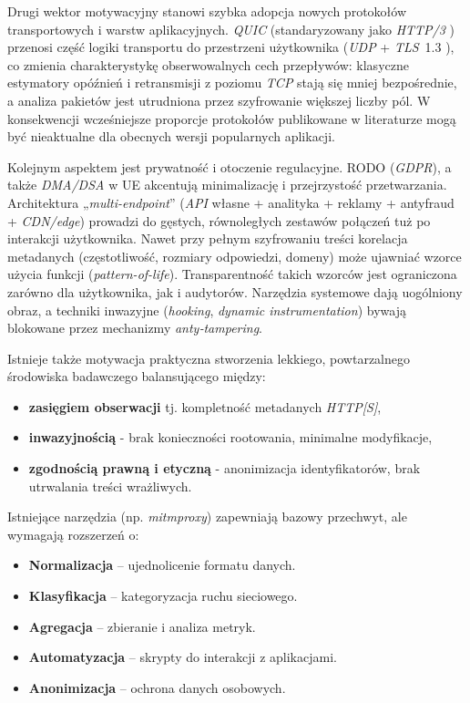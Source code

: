 Drugi wektor motywacyjny stanowi szybka adopcja nowych protokołów transportowych i warstw aplikacyjnych. \emph{QUIC} (standaryzowany jako \emph{HTTP/3} \cite{RFC9114}) przenosi część logiki transportu do przestrzeni użytkownika (\emph{UDP} + \emph{TLS}~1.3 \cite{RFC8446}), co zmienia charakterystykę obserwowalnych cech przepływów: klasyczne estymatory opóźnień i retransmisji z poziomu \emph{TCP} stają się mniej bezpośrednie, a analiza pakietów jest utrudniona przez szyfrowanie większej liczby pól. W konsekwencji wcześniejsze proporcje protokołów publikowane w literaturze mogą być nieaktualne dla obecnych wersji popularnych aplikacji.

Kolejnym aspektem jest prywatność i otoczenie regulacyjne. RODO (\emph{GDPR}), a także \emph{DMA/DSA} w UE akcentują minimalizację i przejrzystość przetwarzania. Architektura „\emph{multi-endpoint}” (\emph{API} własne + analityka + reklamy + antyfraud + \emph{CDN/edge}) prowadzi do gęstych, równoległych zestawów połączeń tuż po interakcji użytkownika. Nawet przy pełnym szyfrowaniu treści korelacja metadanych (częstotliwość, rozmiary odpowiedzi, domeny) może ujawniać wzorce użycia funkcji (\emph{pattern-of-life}). Transparentność takich wzorców jest ograniczona zarówno dla użytkownika, jak i audytorów. Narzędzia systemowe dają uogólniony obraz, a techniki inwazyjne (\emph{hooking}, \emph{dynamic instrumentation}) bywają blokowane przez mechanizmy \emph{anty‑tampering}.

Istnieje także motywacja praktyczna stworzenia lekkiego, powtarzalnego środowiska badawczego balansującego między:
\begin{itemize}
  \item \textbf{zasięgiem obserwacji} tj. kompletność metadanych \emph{HTTP[S]},
  \item \textbf{inwazyjnością} - brak konieczności rootowania, minimalne modyfikacje,
  \item \textbf{zgodnością prawną i etyczną} - anonimizacja identyfikatorów, brak utrwalania treści wrażliwych.
\end{itemize}
Istniejące narzędzia (np. \emph{mitmproxy}) zapewniają bazowy przechwyt, ale wymagają rozszerzeń o: 
\begin{itemize}
  \item \textbf{Normalizacja} – ujednolicenie formatu danych.
  \item \textbf{Klasyfikacja} – kategoryzacja ruchu sieciowego.
  \item \textbf{Agregacja} – zbieranie i analiza metryk.
  \item \textbf{Automatyzacja} – skrypty do interakcji z aplikacjami.
  \item \textbf{Anonimizacja} – ochrona danych osobowych.
\end{itemize}

